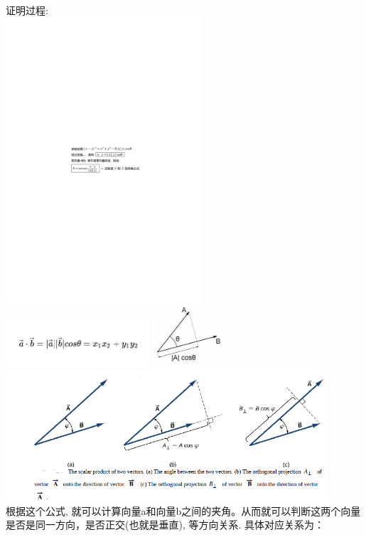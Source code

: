 \documentclass[UTF8]{ctexart}
\begin{document}
证明过程: \\
\includegraphics[width=0.55\textwidth]{img/0100.pdf}\\



\includegraphics[width=0.4\textwidth]{img/0097.png}
\includegraphics[width=0.2\textwidth]{img/0098.png} \\
\includegraphics[width=0.9\textwidth]{img/0099.png} \\

根据这个公式, 就可以计算向量a和向量b之间的夹角。从而就可以判断这两个向量是否是同一方向，是否正交(也就是垂直), 等方向关系. 具体对应关系为：\\
\end{document}
